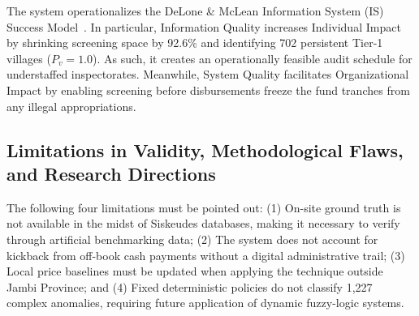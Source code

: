\documentclass[conference]{IEEEtran}
\begin{document}
\begin{table}[htbp]
\centering
\caption{Design Science Research (DSR) Evaluation Matrix for Protocol 2}
\label{tab:dsr_matrix}
\setlength{\tabcolsep}{2.5pt}
\end{table}


The system operationalizes the DeLone \& McLean Information System (IS) Success Model~\cite{ref10}. In particular, Information Quality increases Individual Impact by shrinking screening space by 92.6\% and identifying 702 persistent Tier-1 villages ($P_v = 1.0$). As such, it creates an operationally feasible audit schedule for understaffed inspectorates. Meanwhile, System Quality facilitates Organizational Impact by enabling screening before disbursements freeze the fund tranches from any illegal appropriations.

\subsection{Limitations in Validity, Methodological Flaws, and Research Directions}

The following four limitations must be pointed out: (1) On-site ground truth is not available in the midst of Siskeudes databases, making it necessary to verify through artificial benchmarking data; (2) The system does not account for kickback from off-book cash payments without a digital administrative trail; (3) Local price baselines must be updated when applying the technique outside Jambi Province; and (4) Fixed deterministic policies do not classify 1,227 complex anomalies, requiring future application of dynamic fuzzy-logic systems.
\end{document}
